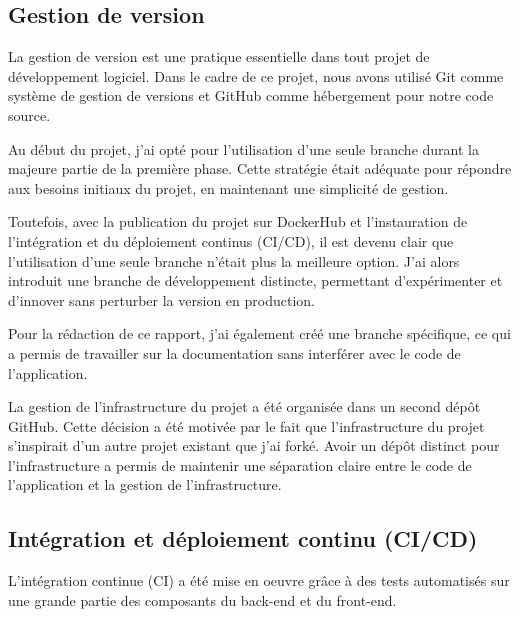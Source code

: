 \subsection{Gestion de version}\label{subsec:gestion-de-version}

La gestion de version est une pratique essentielle dans tout projet de développement logiciel.
Dans le cadre de ce projet, nous avons utilisé Git comme système de gestion de versions et GitHub comme hébergement pour notre code source.

Au début du projet, j'ai opté pour l'utilisation d'une seule branche durant la majeure partie de la première phase.
Cette stratégie était adéquate pour répondre aux besoins initiaux du projet, en maintenant une simplicité de gestion.

Toutefois, avec la publication du projet sur DockerHub et l'instauration de l'intégration et du déploiement continus (CI/CD), il est devenu clair que l'utilisation d'une seule branche n'était plus la meilleure option.
J'ai alors introduit une branche de développement distincte, permettant d'expérimenter et d'innover sans perturber la version en production.

Pour la rédaction de ce rapport, j'ai également créé une branche spécifique, ce qui a permis de travailler sur la documentation sans interférer avec le code de l'application.

La gestion de l'infrastructure du projet a été organisée dans un second dépôt GitHub.
Cette décision a été motivée par le fait que l'infrastructure du projet s'inspirait d'un autre projet existant que j'ai forké.
Avoir un dépôt distinct pour l'infrastructure a permis de maintenir une séparation claire entre le code de l'application et la gestion de l'infrastructure.

\subsection{Intégration et déploiement continu (CI/CD)}\label{subsec:integration-et-deploiement-continu-(ci/cd)}

L'intégration continue (CI) a été mise en oeuvre grâce à des tests automatisés sur une grande partie des composants du back-end et du front-end.

